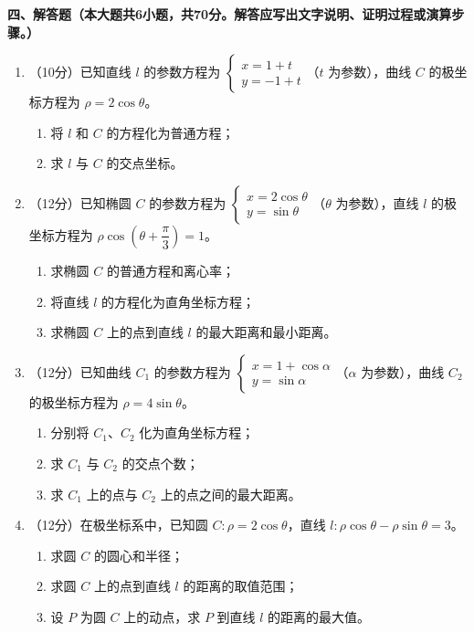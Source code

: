\documentclass[12pt, a4paper]{ctexart}
\begin{document}
\vspace{0.5cm}

\noindent\textbf{四、解答题（本大题共6小题，共70分。解答应写出文字说明、证明过程或演算步骤。）}

\vspace{0.3cm}

\begin{enumerate}[resume]
\item （10分）已知直线 $l$ 的参数方程为 $\begin{cases} x = 1 + t \\ y = -1 + t \end{cases}$（$t$ 为参数），曲线 $C$ 的极坐标方程为 $\rho = 2\cos\theta$。
\begin{enumerate}[label=(\arabic*)]
\item 将 $l$ 和 $C$ 的方程化为普通方程；
\item 求 $l$ 与 $C$ 的交点坐标。
\end{enumerate}

\item （12分）已知椭圆 $C$ 的参数方程为 $\begin{cases} x = 2\cos\theta \\ y = \sin\theta \end{cases}$（$\theta$ 为参数），直线 $l$ 的极坐标方程为 $\rho\cos\left(\theta + \dfrac{\pi}{3}\right) = 1$。
\begin{enumerate}[label=(\arabic*)]
\item 求椭圆 $C$ 的普通方程和离心率；
\item 将直线 $l$ 的方程化为直角坐标方程；
\item 求椭圆 $C$ 上的点到直线 $l$ 的最大距离和最小距离。
\end{enumerate}

\item （12分）已知曲线 $C_1$ 的参数方程为 $\begin{cases} x = 1 + \cos\alpha \\ y = \sin\alpha \end{cases}$（$\alpha$ 为参数），曲线 $C_2$ 的极坐标方程为 $\rho = 4\sin\theta$。
\begin{enumerate}[label=(\arabic*)]
\item 分别将 $C_1$、$C_2$ 化为直角坐标方程；
\item 求 $C_1$ 与 $C_2$ 的交点个数；
\item 求 $C_1$ 上的点与 $C_2$ 上的点之间的最大距离。
\end{enumerate}

\item （12分）在极坐标系中，已知圆 $C: \rho = 2\cos\theta$，直线 $l: \rho\cos\theta - \rho\sin\theta = 3$。
\begin{enumerate}[label=(\arabic*)]
\item 求圆 $C$ 的圆心和半径；
\item 求圆 $C$ 上的点到直线 $l$ 的距离的取值范围；
\item 设 $P$ 为圆 $C$ 上的动点，求 $P$ 到直线 $l$ 的距离的最大值。
\end{enumerate}


\end{enumerate}
\end{document}
